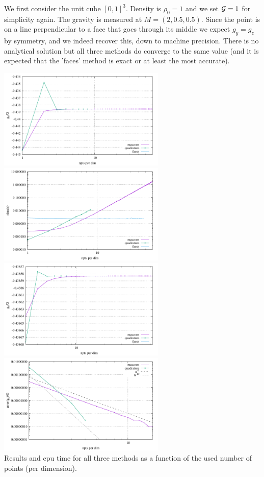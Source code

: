 We first consider the unit cube $[0,1]^3$. Density is $\rho_0=1$ and 
we set ${\cal G}=1$ for simplicity again.
The gravity is measured at $M=(2,0.5,0.5)$. Since the point is on a line perpendicular 
to a face that goes through its middle we expect $g_y=g_z$ by symmetry, and 
we indeed recover this, down to machine precision.
There is no analytical solution but all three methods do converge to the same value
(and it is expected that the 'faces' method is exact or at least the most accurate).

\begin{center}
\includegraphics[width=8cm]{python_codes/fieldstone_113/results/hex_test1/gx.pdf}
\includegraphics[width=8cm]{python_codes/fieldstone_113/results/hex_test1/time.pdf}\\
\includegraphics[width=8cm]{python_codes/fieldstone_113/results/hex_test1/gx2.pdf}
\includegraphics[width=8cm]{python_codes/fieldstone_113/results/hex_test1/gx3.pdf}\\
{\captionfont Results and cpu time for all three methods as a function of 
the used number of points (per dimension).}
\end{center}

